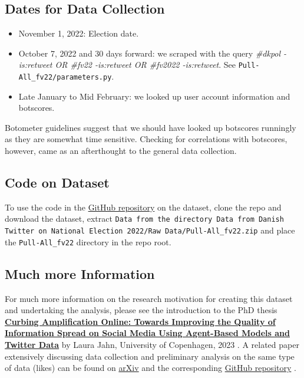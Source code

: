 \documentclass[10pt,english,sigconf,authoryear,nonacm]{article}
\begin{document}
\subsection*{Dates for Data Collection}
\begin{itemize}
\item November 1, 2022: Election date.
\item October 7, 2022 and 30 days forward: we scraped with the query \emph{\#dkpol
-is:retweet OR \#fv22 -is:retweet OR \#fv2022 -is:retweet}. See \texttt{Pull-All\_fv22/parameters.py}.
\item Late January to Mid February: we looked up user account information
and botscores.
\end{itemize}
Botometer guidelines suggest that we should have looked up botscores
runningly as they are somewhat time sensitive. Checking for correlations
with botscores, however, came as an afterthought to the general data
collection.\medskip{}


\subsection*{Code on Dataset}

To use the code in the \href{https://github.com/LJ-9/Danish-Election-2022-Twitter-Likes-Retweets-Botscores-Inauthentic-Coordinated-Behavior}{GitHub repository}
on the dataset, clone the repo and download the dataset, extract \texttt{Data
from the directory Data from Danish Twitter on National Election 2022/Raw
Data/Pull-All\_fv22.zip} and place the \texttt{Pull-All\_fv22} directory
in the repo root.\medskip{}


\subsection*{Much more Information}

For much more information on the research motivation for creating
this dataset and undertaking the analysis, please see the introduction
to the PhD thesis \textbf{\href{https://github.com/LJ-9/Danish-Election-2022-Twitter-Likes-Retweets-Botscores-Inauthentic-Coordinated-Behavior/blob/main/documents/Jahn_Laura_PhD_Thesis_2023_online.pdf}{Curbing Amplification Online: Towards Improving the Quality of Information Spread on Social Media Using Agent-Based Models and Twitter Data}}
by Laura Jahn, University of Copenhagen, 2023 \cite{LauraThesis}.
A related paper extensively discussing data collection and preliminary
analysis on the same type of data (likes) can be found on \href{https://arxiv.org/abs/2305.07384}{arXiv}
\cite{JahnRendsvigTwitterLikesCIB} and the corresponding \href{https://github.com/humanplayer2/get-twitter-likers-data}{GitHub repository}
\cite{JahnRendsvig22GetLikers}.
\end{document}
